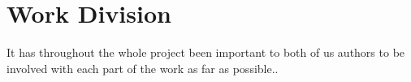 \chapter{Work Division}
\label{chp:work_division}

It has throughout the whole project been important to both of us authors to be involved with each part of the work as far as possible.. %